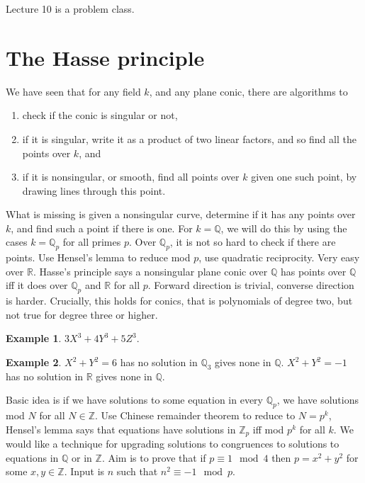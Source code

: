 \documentclass{article}
\newcommand{\Z}{\mathbb{Z}}
\newcommand{\Q}{\mathbb{Q}}
\newcommand{\R}{\mathbb{R}}
\theoremstyle{definition}\newtheorem{definition}{Definition}[section]
\theoremstyle{definition}\newtheorem{remark}[definition]{Remark}
\theoremstyle{definition}\newtheorem*{example}{Example}
\theoremstyle{definition}\newtheorem*{note}{Note}
\begin{document}
Lecture 10 is a problem class.


\section{The Hasse principle}

We have seen that for any field $ k $, and any plane conic, there are algorithms to
\begin{enumerate}
\item check if the conic is singular or not,
\item if it is singular, write it as a product of two linear factors, and so find all the points over $ k $, and
\item if it is nonsingular, or smooth, find all points over $ k $ given one such point, by drawing lines through this point.
\end{enumerate}
What is missing is given a nonsingular curve, determine if it has any points over $ k $, and find such a point if there is one. For $ k = \Q $, we will do this by using the cases $ k = \Q_p $ for all primes $ p $. Over $ \Q_p $, it is not so hard to check if there are points. Use Hensel's lemma to reduce mod $ p $, use quadratic reciprocity. Very easy over $ \R $. Hasse's principle says a nonsingular plane conic over $ \Q $ has points over $ \Q $ iff it does over $ \Q_p $ and $ \R $ for all $ p $. Forward direction is trivial, converse direction is harder. Crucially, this holds for conics, that is polynomials of degree two, but not true for degree three or higher.

\begin{example}
$ 3X^3 + 4Y^3 + 5Z^3 $.
\end{example}

\begin{example}
$ X^2 + Y^2 = 6 $ has no solution in $ \Q_3 $ gives none in $ \Q $. $ X^2 + Y^2 = -1 $ has no solution in $ \R $ gives none in $ \Q $.
\end{example}

Basic idea is if we have solutions to some equation in every $ \Q_p $, we have solutions mod $ N $ for all $ N \in \Z $. Use Chinese remainder theorem to reduce to $ N = p^k $, Hensel's lemma says that equations have solutions in $ \Z_p $ iff mod $ p^k $ for all $ k $. We would like a technique for upgrading solutions to congruences to solutions to equations in $ \Q $ or in $ \Z $. Aim is to prove that if $ p \equiv 1 \mod 4 $ then $ p = x^2 + y^2 $ for some $ x, y \in \Z $. Input is $ n $ such that $ n^2 \equiv -1 \mod p $.
\end{document}
